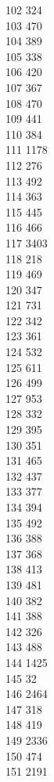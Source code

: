 { 102	324 \\
 103	470 \\
 104	389 \\
 105	338 \\
 106	420 \\
 107	367 \\
 108	470 \\
 109	441 \\
 110	384 \\
 111	1178 \\
 112	276 \\
 113	492 \\
 114	363 \\
 115	445 \\
 116	466 \\
 117	3403 \\
 118	218 \\
 119	469 \\
 120	347 \\
 121	731 \\
 122	342 \\
 123	361 \\
 124	532 \\
 125	611 \\
 126	499 \\
 127	953 \\
 128	332 \\
 129	395 \\
 130	351 \\
 131	465 \\
 132	437 \\
 133	377 \\
 134	394 \\
 135	492 \\
 136	388 \\
 137	368 \\
 138	413 \\
 139	481 \\
 140	382 \\
 141	388 \\
 142	326 \\
 143	488 \\
 144	1425 \\
 145	32 \\
 146	2464 \\
 147	318 \\
 148	419 \\
 149	2336 \\
 150	474 \\
 151	2191 \\
}
